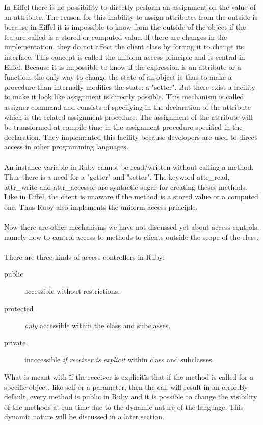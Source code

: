 \documentclass[12pt,a4paper,twocolumn]{article}
\begin{document}
In Eiffel there is no possibility to directly perform an assignment on the value of an attribute. The reason for this inability to assign attributes from the outside is because in Eiffel it is impossible to know from the outside of the object if the feature called is a stored or computed value. If there are changes in the implementation, they do not affect the client class by forcing it to change its interface. This concept is called the uniform-access principle and is central in Eiffel. Because it is impossible to know if the expression is an attribute or a function, the only way to change the state of an object is thus to make a procedure than internally modifies the state: a "setter". But there exist a facility to make it look like assignment is directly possible. This mechanism is called assigner command and consists of specifying in the declaration of the attribute which is the related assignment procedure. The assignment of the attribute will be transformed at compile time in the assignment procedure specified in the declaration. They implemented this facility because developers are used to direct access in other programming languages.
\\
\\
An instance variable in Ruby cannot be read/written without calling a method. Thus there is a need for a  "getter" and "setter". The keyword attr\_read, attr\_write and attr\_accessor are syntactic sugar for creating theses methods. Like in Eiffel, the client is unaware if the method is a stored value or a computed one. Thus Ruby also implements the uniform-access principle.
\\
\\
Now there are other mechanisms we have not discussed yet about access controls, namely how to control access to methods to clients outside the scope of the class.
\\
\\
There are three kinds of access controllers in Ruby: 
\begin{description}
\item[public] accessible without restrictions.
\item[protected] \textit{only} accessible within the class and subclasses.
\item[private] inaccessible \textit{if receiver is explicit} within class and subclasses.
\end{description}
What is meant with \"if the receiver is explicit\"  is that if the method is called for a specific object, like self or a parameter, then the call will result in an error.By default, every method is public in Ruby and it is possible to change the visibility of the methods at run-time due to the dynamic nature of the language. This dynamic nature will be discussed in a later section.
\end{document}
